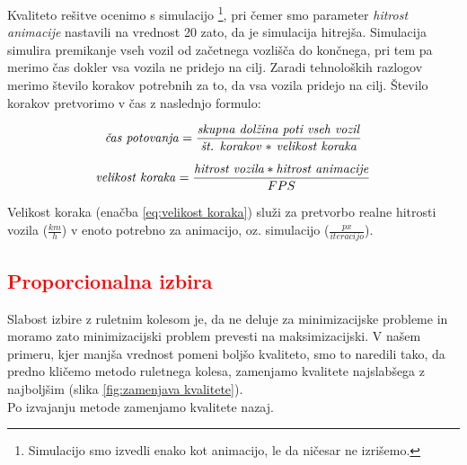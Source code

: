 \documentclass[a4paper, 12pt]{book}
\begin{document}
Kvaliteto re\v sitve ocenimo s simulacijo \footnote{Simulacijo smo izvedli enako kot animacijo, le da ni\v cesar ne izri\v semo.}, pri \v cemer smo parameter \textit{hitrost animacije} nastavili na vrednost 20 zato, da je simulacija hitrej\v sa. Simulacija simulira premikanje vseh vozil od za\v cetnega vozli\v s\v ca do kon\v cnega, pri tem pa merimo \v cas dokler vsa vozila ne pridejo na cilj. Zaradi tehnolo\v skih razlogov merimo \v stevilo korakov potrebnih za to, da vsa vozila pridejo na cilj. \v Stevilo korakov pretvorimo v \v cas z naslednjo formulo:


\begin{equation}
\textrm{\textit{\v cas potovanja}} = \frac{\textrm{\textit{skupna dol\v zina poti vseh vozil}}}{\textrm{\textit{\v st. korakov $*$ velikost koraka}}}
\end{equation}

\begin{equation}
\textrm{\textit{velikost koraka}} = \frac{\textrm{\textit{hitrost vozila}}*\textrm{\textit{hitrost animacije}}}{FPS}
\label{eq:velikost koraka}
\end{equation}

Velikost koraka (ena\v cba \ref{eq:velikost koraka}) slu\v zi za pretvorbo realne hitrosti vozila ($\frac{km}{h}$) v enoto potrebno za animacijo, oz. simulacijo ($\frac{px}{iteracijo}$).

\subsection{\textcolor{red}{Proporcionalna izbira}}
Slabost izbire z ruletnim kolesom je, da ne deluje za minimizacijske probleme in moramo zato minimizacijski problem prevesti na maksimizacijski. V na\v sem primeru, kjer manj\v sa vrednost pomeni bolj\v so kvaliteto, smo to naredili tako, da predno kli\v cemo metodo ruletnega kolesa, zamenjamo kvalitete najslab\v sega z najbolj\v sim (slika \ref{fig:zamenjava kvalitete}).\\ Po izvajanju metode zamenjamo kvalitete nazaj.
\end{document}
